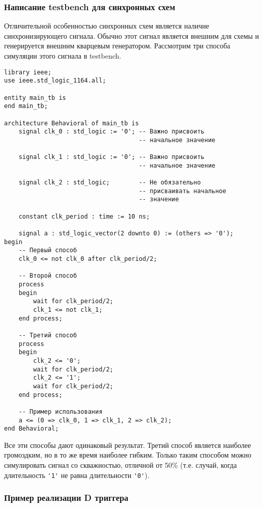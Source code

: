 \subsubsection{Написание testbench для синхронных схем}

Отличительной особенностью синхронных схем является наличие синхронизирующего сигнала. Обычно этот сигнал является внешним для схемы и генерируется внешним кварцевым генератором. Рассмотрим три способа симуляции этого сигнала в testbench.

\begin{Code}
\begin{lstlisting}
library ieee;
use ieee.std_logic_1164.all;

entity main_tb is
end main_tb;

architecture Behavioral of main_tb is
    signal clk_0 : std_logic := '0'; -- Важно присвоить 
                                     -- начальное значение

    signal clk_1 : std_logic := '0'; -- Важно присвоить 
                                     -- начальное значение

    signal clk_2 : std_logic;        -- Не обязательно 
                                     -- присваивать начальное 
                                     -- значение
    
    constant clk_period : time := 10 ns;
    
    signal a : std_logic_vector(2 downto 0) := (others => '0');
begin
    -- Первый способ
    clk_0 <= not clk_0 after clk_period/2;
    
    -- Второй способ
    process
    begin
        wait for clk_period/2;
        clk_1 <= not clk_1;
    end process;
    
    -- Третий способ
    process
    begin
        clk_2 <= '0';
        wait for clk_period/2;
        clk_2 <= '1';
        wait for clk_period/2;
    end process;
    
    -- Пример использования
    a <= (0 => clk_0, 1 => clk_1, 2 => clk_2);
end Behavioral;
\end{lstlisting}
\end{Code}

Все эти способы дают одинаковый результат. Третий способ является наиболее громоздким, но в то же время наиболее гибким. Только таким способом можно симулировать сигнал со скважностью, отличной от 50\% (т.е. случай, когда длительность \lstinline?'1'? не равна длительности \lstinline?'0'?).

\subsubsection{Пример реализации D триггера}

